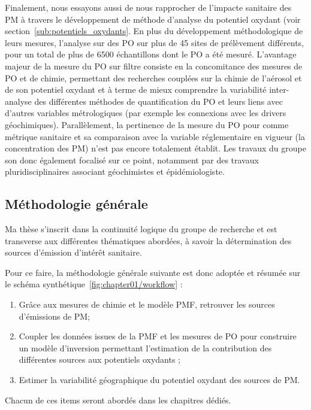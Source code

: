 Finalement, nous essayons aussi de nous rapprocher de l'impacte sanitaire des PM à
travers le développement de méthode d'analyse du potentiel oxydant (voir
section~\ref{sub:potentiels_oxydants}. En plus du développement méthodologique de leurs
mesures, l'analyse sur des PO sur plus de 45 sites de prélèvement différents, pour un
total de plus de 6500 échantillons dont le PO a été mesuré.
L'avantage majeur de la mesure du PO sur filtre consiste en la concomitance des mesures de
PO et de chimie, permettant des recherches couplées sur la chimie de l'aérosol et de son
potentiel oxydant et à terme de mieux comprendre la variabilité inter-analyse des différentes
méthodes de quantification du PO et leurs liens avec d'autres variables métrologiques (par
exemple les connexions avec les drivers géochimiques). Parallèlement, la pertinence de la
mesure du PO pour comme métrique sanitaire et sa comparaison avec la variable
réglementaire en vigueur (la concentration des PM) n'est pas encore totalement établit.
Les travaux du groupe son donc également focalisé sur ce point, notamment par des travaux
pluridisciplinaires associant géochimistes et épidémiologiste.

\subsection{Méthodologie générale}%
\label{sub:méthodologie_general}

Ma thèse s'inscrit dans la continuité logique du groupe de recherche et est transverse aux
différentes thématiques abordées, à savoir la détermination des sources d'émission d'intérêt
sanitaire.

Pour ce faire, la méthodologie générale suivante est donc adoptée et résumée sur le schéma
synthétique~\ref{fig:chapter01/workflow} :

\begin{enumerate}
    \item Grâce aux mesures de chimie et le modèle PMF, retrouver les sources d'émissions
        de PM;
    \item Coupler les données issues de la PMF et les mesures de PO pour construire un
        modèle d'inversion permettant l'estimation de la contribution des différentes
        sources aux potentiels oxydants ;
    \item Estimer la variabilité géographique du potentiel oxydant des sources de PM.
\end{enumerate}

Chacun de ces items seront abordés dans les chapitres dédiés.

